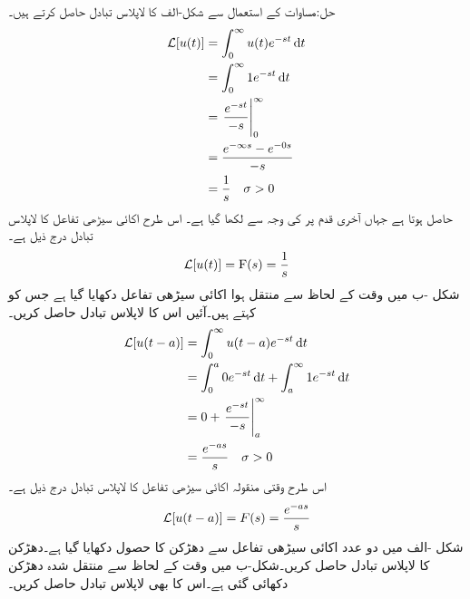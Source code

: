 حل:مساوات  کے استعمال سے شکل-الف کا لاپلاس تبادل حاصل کرتے ہیں۔
\begin{align*}
\Laplace[u(t)]&=\int_0^{\infty} u(t) e^{-st}\dif t\\
&=\int_0^{\infty} 1e^{-st} \dif t\\
&=\left . \frac{e^{-st}}{-s}\right|_0^{\infty}\\
&=\frac{e^{-\infty s}-e^{-0 s}}{-s}\\
&=\frac{1}{s} \quad \sigma >0
\end{align*}
حاصل ہوتا ہے  جہاں آخری قدم پر  کی وجہ سے  لکھا گیا ہے۔ اس طرح اکائی سیڑھی تفاعل کا لاپلاس تبادل درج ذیل ہے۔
\begin{align}
\mathcal{L}[u(t)]={{\textup{F}}}(s)=\frac{1}{s}
\end{align}
شکل -ب میں  وقت کے لحاظ سے منتقل ہوا اکائی سیڑھی تفاعل دکھایا گیا ہے جس کو  کہتے ہیں۔آئیں اس کا لاپلاس تبادل حاصل کریں۔
\begin{align*}
\Laplace[u(t-a)]&=\int_0^{\infty} u(t-a) e^{-st} \dif t\\
&=\int_0^a 0 e^{-st} \dif t+\int_a^{\infty} 1 e^{-st}\dif t\\
&=0+\left. \frac{e^{-st}}{-s}\right|_a^{\infty}\\
&=\frac{e^{-as}}{s} \quad \sigma >0
\end{align*} 
اس طرح وقتی منقولہ اکائی سیڑھی تفاعل کا لاپلاس تبادل درج ذیل ہے۔
\begin{align}\label{مساوات_لاپلاس_منقولہ_اکائی_سیڑھی}
\mathcal{L}[u(t-a)]=F(s)=\frac{e^{-as}}{s}
\end{align}
شکل -الف میں دو عدد اکائی سیڑھی تفاعل سے دھڑکن کا حصول دکھایا گیا ہے۔دھڑکن کا لاپلاس تبادل حاصل کریں۔شکل-ب میں وقت کے لحاظ سے منتقل شدہ دھڑکن دکھائی گئی ہے۔اس کا بھی لاپلاس تبادل حاصل کریں۔ 
